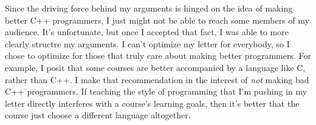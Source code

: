 \documentclass{article}
\begin{document}
Since the driving force behind my arguments is hinged on the idea of making better C++ programmers, I just might not be able to reach some members of my audience.  It's unfortunate, but once I accepted that fact, I was able to more clearly structre my arguments.  I can't optimize my letter for everybody, so I chose to optimize for those that truly care about making better programmers.  For example, I posit that some courses are better accompanied by a language like C, rather than C++.  I make that recommendation in the interest of \emph{not} making bad C++ programmers.  If teaching the style of programming that I'm pushing in my letter directly interferes with a course's learning goals, then it's better that the course just choose a different language altogether.
\end{document}

